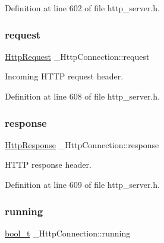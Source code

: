 Definition at line 602 of file http\+\_\+server.\+h.

\mbox{\label{struct__HttpConnection_a847bc3bc0c12c03e8410d2b5ee2d5586}} 
\subsubsection{\texorpdfstring{request}{request}}
{\footnotesize\ttfamily \hyperlink{structHttpRequest}{Http\+Request} \+\_\+\+Http\+Connection\+::request}



Incoming H\+T\+TP request header. 



Definition at line 608 of file http\+\_\+server.\+h.

\mbox{\label{struct__HttpConnection_ac70e7a2a9acb5be032d9fbc2e4fdf8f2}} 
\subsubsection{\texorpdfstring{response}{response}}
{\footnotesize\ttfamily \hyperlink{structHttpResponse}{Http\+Response} \+\_\+\+Http\+Connection\+::response}



H\+T\+TP response header. 



Definition at line 609 of file http\+\_\+server.\+h.

\mbox{\label{struct__HttpConnection_a5a7aaa19047a6dd990b6098d652af9b2}} 
\subsubsection{\texorpdfstring{running}{running}}
{\footnotesize\ttfamily \hyperlink{compiler__port_8h_a812d16e5494522586b3784e55d479912}{bool\+\_\+t} \+\_\+\+Http\+Connection\+::running}



